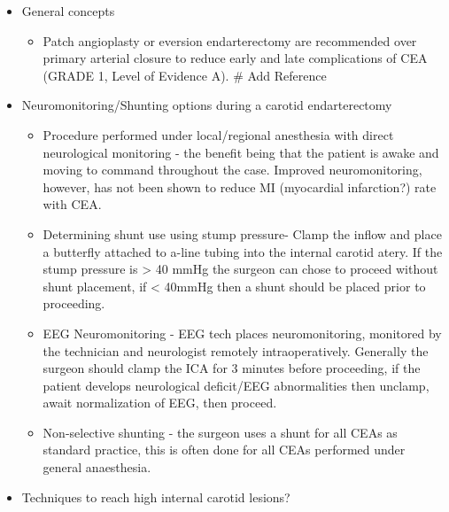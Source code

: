 \documentclass[
]{book}
\providecommand{\tightlist}{%
  \setlength{\itemsep}{0pt}\setlength{\parskip}{0pt}}
\begin{document}
\begin{itemize}
\item
  General concepts

  \begin{itemize}
  \tightlist
  \item
    Patch angioplasty or eversion endarterectomy are recommended
    over primary arterial closure to reduce early and late
    complications of CEA (GRADE 1, Level of Evidence A). \# Add
    Reference
  \end{itemize}
\item
  Neuromonitoring/Shunting options during a carotid endarterectomy

  \begin{itemize}
  \item
    Procedure performed under local/regional anesthesia with direct
    neurological monitoring - the benefit being that the patient is
    awake and moving to command throughout the case. Improved
    neuromonitoring, however, has not been shown to reduce MI
    (myocardial infarction?) rate with CEA.
  \item
    Determining shunt use using stump pressure- Clamp the inflow and
    place a butterfly attached to a-line tubing into the internal
    carotid atery. If the stump pressure is \textgreater{} 40 mmHg the surgeon
    can chose to proceed without shunt placement, if \textless{} 40mmHg then
    a shunt should be placed prior to proceeding.
  \item
    EEG Neuromonitoring - EEG tech places neuromonitoring, monitored
    by the technician and neurologist remotely intraoperatively.
    Generally the surgeon should clamp the ICA for 3 minutes before
    proceeding, if the patient develops neurological deficit/EEG
    abnormalities then unclamp, await normalization of EEG, then
    proceed.
  \item
    Non-selective shunting - the surgeon uses a shunt for all CEAs
    as standard practice, this is often done for all CEAs performed
    under general anaesthesia.
  \end{itemize}
\item
  Techniques to reach high internal carotid lesions?


\end{itemize}
\end{document}
